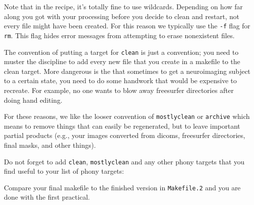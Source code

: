 Note that in the recipe, it's totally fine to use wildcards. Depending on how far along you got with your processing before you decide to clean and restart, not every file might have been created.  For this reason we typically use the \texttt{-f} flag for \texttt{rm}. This flag hides error messages from attempting to erase nonexistent files. 

The convention of putting a target for \texttt{clean} is just a convention; you need to muster the discipline to add every new file that you create in a makefile to the clean target. More dangerous is the that sometimes to get a neuroimaging subject to a certain state, you need to do some handwork that would be expensive to recreate. For example, no one wants to blow away freesurfer directories after doing hand editing. 

For these reasons, we like the looser convention of \texttt{mostlyclean} or \texttt{archive} which means to remove things that can easily be regenerated, but to leave important partial products (e.g., your images converted from dicoms, freesurfer directories, final masks, and other things).

Do not forget to add \texttt{clean}, \texttt{mostlyclean} and any other phony targets that you find useful to your list of phony targets:

Compare your final makefile to the finished version in \texttt{Makefile.2} and you are done with the first practical.
